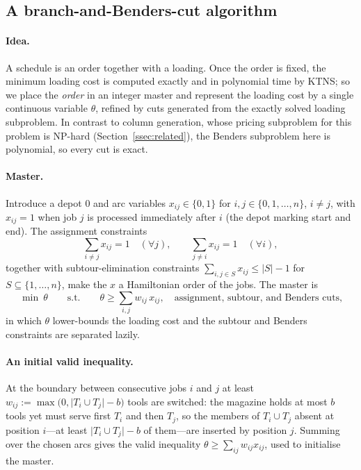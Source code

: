 \documentclass[11pt,a4paper]{article}
\theoremstyle{plain}
\theoremstyle{definition}
\theoremstyle{remark}
\begin{document}
\subsection{A branch-and-Benders-cut algorithm}\label{ssec:bbc}
\paragraph{Idea.}
A schedule is an order together with a loading. Once the order is fixed, the minimum
loading cost is computed exactly and in polynomial time by KTNS; so we place the
\emph{order} in an integer master and represent the loading cost by a single
continuous variable $\theta$, refined by cuts generated from the exactly solved
loading subproblem. In contrast to column generation, whose pricing subproblem for
this problem is NP-hard (Section~\ref{ssec:related}), the Benders subproblem here is
polynomial, so every cut is exact.

\paragraph{Master.}
Introduce a depot $0$ and arc variables $x_{ij}\in\{0,1\}$ for $i,j\in\{0,1,\dots,
n\}$, $i\ne j$, with $x_{ij}=1$ when job $j$ is processed immediately after $i$ (the
depot marking start and end). The assignment constraints
\[
  \sum_{i\ne j}x_{ij}=1\quad(\forall j),\qquad
  \sum_{j\ne i}x_{ij}=1\quad(\forall i),
\]
together with subtour-elimination constraints $\sum_{i,j\in S}x_{ij}\le\lvert S
\rvert-1$ for $S\subseteq\{1,\dots,n\}$, make the $x$ a Hamiltonian order of the
jobs. The master is
\[
  \min\ \theta \qquad\text{s.t.}\qquad
  \theta\ge\textstyle\sum_{i,j}w_{ij}\,x_{ij},\quad
  \text{assignment, subtour, and Benders cuts,}
\]
in which $\theta$ lower-bounds the loading cost and the subtour and Benders
constraints are separated lazily.

\paragraph{An initial valid inequality.}
At the boundary between consecutive jobs $i$ and $j$ at least
$w_{ij}:=\max\bigl(0,\lvert T_i\cup T_j\rvert-b\bigr)$ tools are switched: the
magazine holds at most $b$ tools yet must serve first $T_i$ and then $T_j$, so the
members of $T_i\cup T_j$ absent at position $i$---at least $\lvert T_i\cup T_j\rvert
-b$ of them---are inserted by position $j$. Summing over the chosen arcs gives the
valid inequality $\theta\ge\sum_{ij}w_{ij}x_{ij}$, used to initialise the master.
\end{document}
